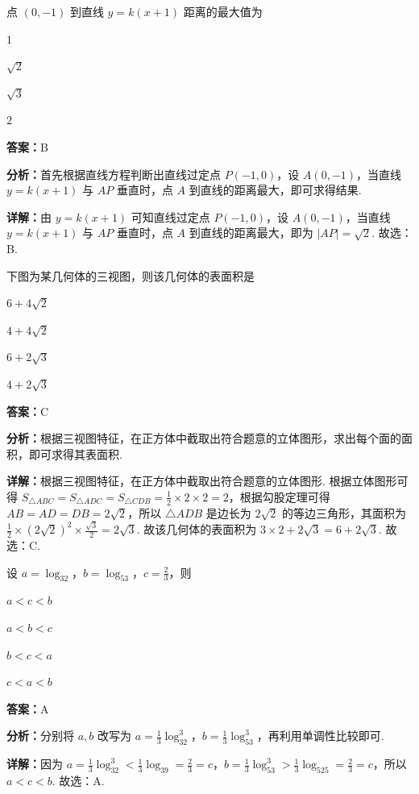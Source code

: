 \begin{question}[points=5]
点 $(0,-1)$ 到直线 $y=k(x+1)$ 距离的最大值为
\begin{choices}
  \item $1$
  \item $\sqrt{2}$
  \item $\sqrt{3}$
  \item $2$
\end{choices}
\begin{solution}
\textbf{答案：}B

\textbf{分析：}首先根据直线方程判断出直线过定点 $P(-1,0)$，设 $A(0,-1)$，当直线 $y=k(x+1)$ 与 $AP$ 垂直时，点 $A$ 到直线的距离最大，即可求得结果.

\textbf{详解：}由 $y=k(x+1)$ 可知直线过定点 $P(-1,0)$，设 $A(0,-1)$，当直线 $y=k(x+1)$ 与 $AP$ 垂直时，点 $A$ 到直线的距离最大，即为 $|AP|=\sqrt{2}$. 故选：B.
\end{solution}
\end{question}

\begin{question}[points=5]
下图为某几何体的三视图，则该几何体的表面积是
\begin{choices}
  \item $6+4\sqrt{2}$
  \item $4+4\sqrt{2}$
  \item $6+2\sqrt{3}$
  \item $4+2\sqrt{3}$
\end{choices}
\begin{solution}
\textbf{答案：}C

\textbf{分析：}根据三视图特征，在正方体中截取出符合题意的立体图形，求出每个面的面积，即可求得其表面积.

\textbf{详解：}根据三视图特征，在正方体中截取出符合题意的立体图形. 根据立体图形可得 $S_{\triangle ABC}=S_{\triangle ADC}=S_{\triangle CDB}=\frac{1}{2}\times2\times2=2$，根据勾股定理可得 $AB=AD=DB=2\sqrt{2}$，所以 $\triangle ADB$ 是边长为 $2\sqrt{2}$ 的等边三角形，其面积为 $\frac{1}{2}\times(2\sqrt{2})^2\times\frac{\sqrt{3}}{2}=2\sqrt{3}$. 故该几何体的表面积为 $3\times2+2\sqrt{3}=6+2\sqrt{3}$. 故选：C.
\end{solution}
\end{question}

\begin{question}[points=5]
设 $a=\log_32$，$b=\log_53$，$c=\frac{2}{3}$，则
\begin{choices}
  \item $a<c<b$
  \item $a<b<c$
  \item $b<c<a$
  \item $c<a<b$
\end{choices}
\begin{solution}
\textbf{答案：}A

\textbf{分析：}分别将 $a,b$ 改写为 $a=\frac{1}{3}\log_32^3$，$b=\frac{1}{3}\log_53^3$，再利用单调性比较即可.

\textbf{详解：}因为 $a=\frac{1}{3}\log_32^3<\frac{1}{3}\log_39=\frac{2}{3}=c$，$b=\frac{1}{3}\log_53^3>\frac{1}{3}\log_525=\frac{2}{3}=c$，所以 $a<c<b$. 故选：A.
\end{solution}
\end{question}

